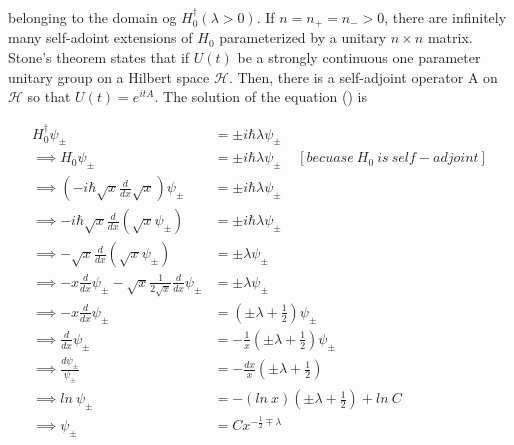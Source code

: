 \documentclass[12pt, letterpaper]{article}
\newcommand*{\1}{\hspace{1pt}}
\begin{document}
        belonging to the domain og $H_{0}^{\dagger}(\lambda>0)$. If $n=n_{+}=n_{-}>0$, there are infinitely many self-adoint extensions of $H_{0}$ parameterized by a 
        unitary $n\times n$ matrix. Stone's theorem states that if $U(t)$ be a strongly continuous one parameter unitary group on a Hilbert space $\mathcal{H}$. 
        Then, there is a self-adjoint operator A on $\mathcal{H}$ so that $U(t) = e^{itA}$. The solution of the equation () is 

        \begin{align*}
            H_{0}^{\dagger} \psi_{\pm} &= \pm i \hbar \lambda \psi_{\pm} \\ 
            \implies H_{0} \psi_{\pm} &= \pm i \hbar \lambda \psi_{\pm} \ \ \ \ \ [becuase\ H_{0} \ is \ self-adjoint] \\
            \implies \left(-i\hbar \sqrt{x} \frac{d}{dx}\sqrt{x}\right)\psi_{\pm} &= \pm i \hbar \lambda \psi _{\pm} \\
            \implies -i\hbar \sqrt{x} \frac{d}{dx}\left(\sqrt{x}\psi_{\pm}\right) &= \pm i \hbar \lambda \psi _{\pm} \\
            \implies -\sqrt{x} \frac{d}{dx}\left(\sqrt{x}\psi_{\pm}\right) &= \pm \lambda \psi _{\pm} \\
            \implies -x\frac{d}{dx}\psi_{\pm} - \sqrt{x}\frac{1}{2\sqrt{x}} \frac{d}{dx}\psi_{\pm} &= \pm \lambda \psi _{\pm} \\
            \implies -x\frac{d}{dx}\psi_{\pm} &= \left(\pm \lambda + \frac{1}{2}\right) \psi _{\pm} \\
            \implies \frac{d}{dx}\psi_{\pm} &= -\frac{1}{x}\left(\pm \lambda + \frac{1}{2}\right) \psi _{\pm} \\
            \implies \frac{d\psi_{\pm}}{\psi_{\pm}} &= -\frac{dx}{x}\left(\pm \lambda + \frac{1}{2}\right) \\
            \implies ln \ \psi_{\pm} &= -\left(ln \ x\right)\left(\pm \lambda + \frac{1}{2}\right) + ln \ C\\
            \implies \psi_{\pm} &=  Cx^{- \frac{1}{2}\mp \lambda}\\
        \end{align*}
\end{document}
